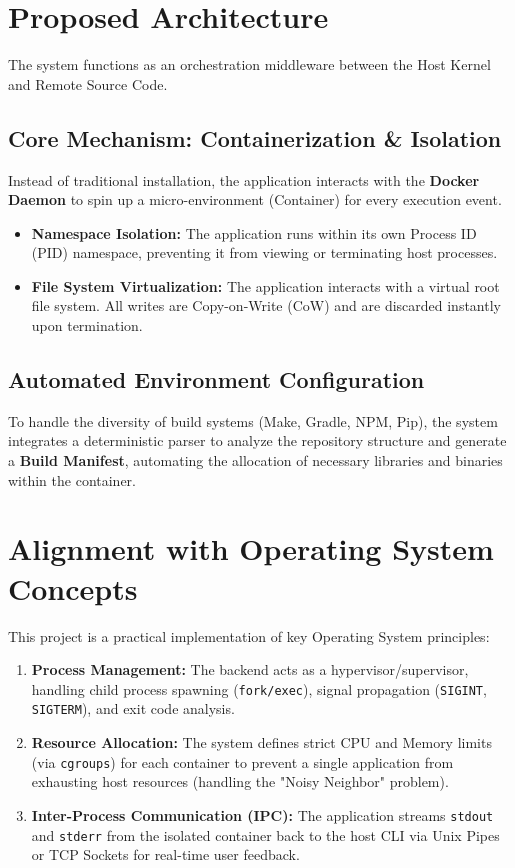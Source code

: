 \documentclass[11pt, a4paper]{article}
\begin{document}
\section{Proposed Architecture}
The system functions as an orchestration middleware between the Host Kernel and Remote Source Code.

\subsection{Core Mechanism: Containerization \& Isolation}
Instead of traditional installation, the application interacts with the \textbf{Docker Daemon} to spin up a micro-environment (Container) for every execution event.
\begin{itemize}
    \item \textbf{Namespace Isolation:} The application runs within its own Process ID (PID) namespace, preventing it from viewing or terminating host processes.
    \item \textbf{File System Virtualization:} The application interacts with a virtual root file system. All writes are Copy-on-Write (CoW) and are discarded instantly upon termination.
\end{itemize}

\subsection{Automated Environment Configuration}
To handle the diversity of build systems (Make, Gradle, NPM, Pip), the system integrates a deterministic parser to analyze the repository structure and generate a \textbf{Build Manifest}, automating the allocation of necessary libraries and binaries within the container.

\section{Alignment with Operating System Concepts}
This project is a practical implementation of key Operating System principles:

\begin{enumerate}
    \item \textbf{Process Management:} The backend acts as a hypervisor/supervisor, handling child process spawning (\texttt{fork/exec}), signal propagation (\texttt{SIGINT}, \texttt{SIGTERM}), and exit code analysis.
    \item \textbf{Resource Allocation:} The system defines strict CPU and Memory limits (via \texttt{cgroups}) for each container to prevent a single application from exhausting host resources (handling the "Noisy Neighbor" problem).
    \item \textbf{Inter-Process Communication (IPC):} The application streams \texttt{stdout} and \texttt{stderr} from the isolated container back to the host CLI via Unix Pipes or TCP Sockets for real-time user feedback.
\end{enumerate}
\end{document}
